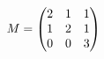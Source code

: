 \documentclass[preview]{standalone}
\begin{document}
\begin{align*}
\special{dvisvgm:raw <g id='unique000'>}M=\begin{pmatrix}2&1&1\\1&2&1\\0&0&3\end{pmatrix}\special{dvisvgm:raw </g>}
\end{align*}
\end{document}
